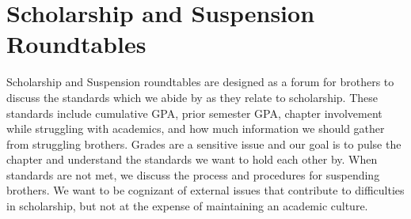   \section*{Scholarship and Suspension Roundtables}
    Scholarship and Suspension roundtables are designed as a forum for brothers to discuss the standards which we abide by as they relate to scholarship. These standards include cumulative GPA, prior semester GPA, chapter involvement while struggling with academics, and how much information we should gather from struggling brothers. Grades are a sensitive issue and our goal is to pulse the chapter  and understand the standards we want to hold each other by. When standards are not met, we discuss the process and procedures for suspending brothers. We want to be cognizant of external issues that contribute to difficulties in scholarship, but not at the expense of maintaining an academic culture.

